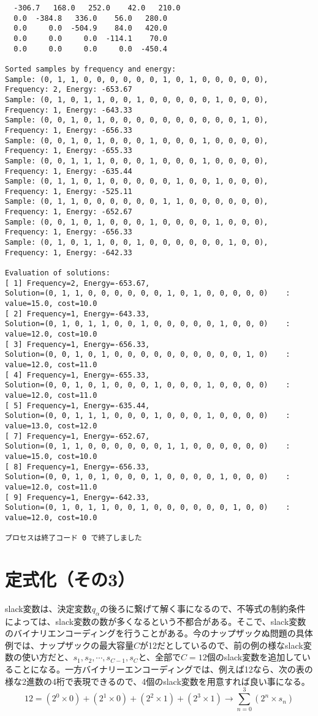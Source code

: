 \documentclass[uplatex,dvipdfmx,a4paper,11pt,oneside,openany]{jsbook}
\begin{document}
\begin{verbatim}
  -306.7   168.0   252.0    42.0   210.0
  0.0  -384.8   336.0    56.0   280.0
  0.0     0.0  -504.9    84.0   420.0
  0.0     0.0     0.0  -114.1    70.0
  0.0     0.0     0.0     0.0  -450.4

Sorted samples by frequency and energy:
Sample: (0, 1, 1, 0, 0, 0, 0, 0, 0, 1, 0, 1, 0, 0, 0, 0, 0), Frequency: 2, Energy: -653.67
Sample: (0, 1, 0, 1, 1, 0, 0, 1, 0, 0, 0, 0, 0, 1, 0, 0, 0), Frequency: 1, Energy: -643.33
Sample: (0, 0, 1, 0, 1, 0, 0, 0, 0, 0, 0, 0, 0, 0, 0, 1, 0), Frequency: 1, Energy: -656.33
Sample: (0, 0, 1, 0, 1, 0, 0, 0, 1, 0, 0, 0, 1, 0, 0, 0, 0), Frequency: 1, Energy: -655.33
Sample: (0, 0, 1, 1, 1, 0, 0, 0, 1, 0, 0, 0, 1, 0, 0, 0, 0), Frequency: 1, Energy: -635.44
Sample: (0, 1, 1, 0, 1, 0, 0, 0, 0, 0, 1, 0, 0, 1, 0, 0, 0), Frequency: 1, Energy: -525.11
Sample: (0, 1, 1, 0, 0, 0, 0, 0, 0, 1, 1, 0, 0, 0, 0, 0, 0), Frequency: 1, Energy: -652.67
Sample: (0, 0, 1, 0, 1, 0, 0, 0, 1, 0, 0, 0, 0, 1, 0, 0, 0), Frequency: 1, Energy: -656.33
Sample: (0, 1, 0, 1, 1, 0, 0, 1, 0, 0, 0, 0, 0, 0, 1, 0, 0), Frequency: 1, Energy: -642.33

Evaluation of solutions:
[ 1] Frequency=2, Energy=-653.67,
Solution=(0, 1, 1, 0, 0, 0, 0, 0, 0, 1, 0, 1, 0, 0, 0, 0, 0)	: value=15.0, cost=10.0
[ 2] Frequency=1, Energy=-643.33,
Solution=(0, 1, 0, 1, 1, 0, 0, 1, 0, 0, 0, 0, 0, 1, 0, 0, 0)	: value=12.0, cost=10.0
[ 3] Frequency=1, Energy=-656.33,
Solution=(0, 0, 1, 0, 1, 0, 0, 0, 0, 0, 0, 0, 0, 0, 0, 1, 0)	: value=12.0, cost=11.0
[ 4] Frequency=1, Energy=-655.33,
Solution=(0, 0, 1, 0, 1, 0, 0, 0, 1, 0, 0, 0, 1, 0, 0, 0, 0)	: value=12.0, cost=11.0
[ 5] Frequency=1, Energy=-635.44,
Solution=(0, 0, 1, 1, 1, 0, 0, 0, 1, 0, 0, 0, 1, 0, 0, 0, 0)	: value=13.0, cost=12.0
[ 7] Frequency=1, Energy=-652.67,
Solution=(0, 1, 1, 0, 0, 0, 0, 0, 0, 1, 1, 0, 0, 0, 0, 0, 0)	: value=15.0, cost=10.0
[ 8] Frequency=1, Energy=-656.33,
Solution=(0, 0, 1, 0, 1, 0, 0, 0, 1, 0, 0, 0, 0, 1, 0, 0, 0)	: value=12.0, cost=11.0
[ 9] Frequency=1, Energy=-642.33,
Solution=(0, 1, 0, 1, 1, 0, 0, 1, 0, 0, 0, 0, 0, 0, 1, 0, 0)	: value=12.0, cost=10.0

プロセスは終了コード 0 で終了しました
\end{verbatim}

\section{定式化（その3）}

slack変数は、決定変数$q_\alpha$の後ろに繋げて解く事になるので、不等式の制約条件によっては、slack変数の数が多くなるという不都合がある。そこで、slack変数のバイナリエンコーディングを行うことがある。今のナップザックぬ問題の具体例では、ナップザックの最大容量$C$が12だとしているので、前の例の様なslack変数の使い方だと、$s_1, s_2,\cdots,s_{C-1}, s_C$と、全部で$C=12$個のslack変数を追加していることになる。一方バイナリーエンコーディングでは、例えば12なら、次の表の様な2進数の4桁で表現できるので、4個のslack変数を用意すれば良い事になる。\\
\[
12 = (2^0 \times 0) + (2^1 \times 0) + (2^2 \times 1) + (2^3 \times 1) \rightarrow \sum_{n=0}^3 (2^n \times s_n)
\]\\
\end{document}
